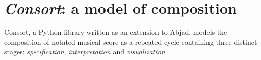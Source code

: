 \chapter{\emph{Consort}: a model of composition}
\label{chap:a-model-of-composition}

\begin{comment}
<abjad>[hide=true]
import collections
import consort
</abjad>
\end{comment}

\begin{comment}
\begin{markdown}
-   Materials
-   Configuration
-   Templating
-   Layers
-   Coarse to fine
-   Rhythm first
-   What is specification? What is a specifier? What is configuration and
    aggregation?
-   What should happen musically, where should it happen?
-   What is material?
-   What is music?
-   Rhythm is interpreted first, as all other parameters depend on it.
-   Rhythm is interpreted from "coarse" to "fine": from the level of phrase
    boundaries to the level of individual notes, rests, tuplets and ties.
-   This discussion only focuses on notation, nothing related to aesthetic
    experience, physical modeling or anything else. This is a tool for a
    specific composer to create scores, not a discussion explicitly of why they
    would work this way (although that should be discussed in the conclusion).
-   Specification and interpretation conceive of the score as a single, hugely
    complex expression.
-   Templating as variation.
-   Define what composition means here: laying out symbols on the page.
-   This way of thinking and working does not attempt to define or even model
    concepts like "melody" or even "phrase". They're too vague. If we use that
    terminology at all, it is only in the most incredibly constrained way.
\end{markdown}
\end{comment}

Consort, a Python library written as an extension to Abjad, models the
composition of notated musical score as a repeated cycle containing three
distinct stages: \emph{specification}, \emph{interpretation} and
\emph{visualization}.

